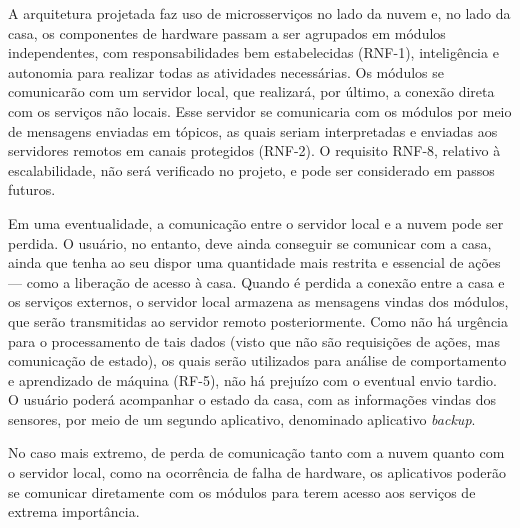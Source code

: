 A arquitetura projetada faz uso de microsserviços no lado da nuvem e, no lado da casa, os componentes de hardware passam a ser agrupados em módulos independentes, com responsabilidades bem estabelecidas (RNF-1), inteligência e autonomia para realizar todas as atividades necessárias. Os módulos se comunicarão com um servidor local, que realizará, por último, a conexão direta com os serviços não locais. Esse servidor se comunicaria com os módulos por meio de mensagens enviadas em tópicos, as quais seriam interpretadas e enviadas aos servidores remotos em canais protegidos (RNF-2). O requisito RNF-8, relativo à escalabilidade, não será verificado no projeto, e pode ser considerado em passos futuros.

Em uma eventualidade, a comunicação entre o servidor local e a nuvem pode ser perdida.  O usuário, no entanto, deve ainda conseguir se comunicar com a casa, ainda que tenha ao seu dispor uma quantidade mais restrita e essencial de ações --- como a liberação de acesso à casa. Quando é perdida a conexão entre a casa e os serviços externos, o servidor local armazena as mensagens vindas dos módulos, que serão transmitidas ao servidor remoto posteriormente. Como não há urgência para o processamento de tais dados (visto que não são requisições de ações, mas comunicação de estado), os quais serão utilizados para análise de comportamento e aprendizado de máquina (RF-5), não há prejuízo com o eventual envio tardio. O usuário poderá acompanhar o estado da casa, com as informações vindas dos sensores, por meio de um segundo aplicativo, denominado aplicativo \emph{backup}.

No caso mais extremo, de perda de comunicação tanto com a nuvem quanto com o servidor local, como na ocorrência de falha de hardware, os aplicativos poderão se comunicar diretamente com os módulos para terem acesso aos serviços de extrema importância.
